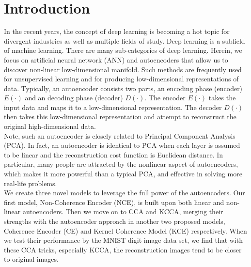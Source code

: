 \documentclass[12pt]{report} %
\begin{document}
\chapter{Introduction}
In the recent years, the concept of deep learning is becoming a hot topic for divergent industries as well as multiple fields of study\cite{AUKM,TF,PR,DLRG}. Deep learning is a subfield of machine learning. There are many sub-categories of deep learning. Herein, we focus on artificial neural network (ANN)\cite{NN,NN2} and autoencoders\cite{AE,AE2,AE3} that allow us to discover non-linear low-dimensional manifold. Such methods are frequently used for unsupervised learning and for producing low-dimensional representations of data. Typically, an autoencoder consists two parts, an encoding phase (encoder) \(E(\cdot)\) and an decoding phase (decoder) \(D(\cdot)\). The encoder \(E(\cdot)\) takes the input data and maps it to a low-dimensional representation. The decoder \(D(\cdot)\) then takes this low-dimensional representation and attempt to reconstruct the original high-dimensional data.\\
Note, such an autoencoder is closely related to Principal Component Analysis (PCA)\cite{PCA,PCA2,STAT,KPCA}. In fact, an autoencoder is identical to PCA when each layer is assumed to be linear and the reconstruction cost function is Euclidean distance. In particular, many people are attracted by the nonlinear aspect of autoencoders, which makes it more powerful than a typical PCA, and effective in solving more real-life problems.\\
We create three novel models to leverage the full power of the autoencoders. Our first model, Non-Coherence Encoder (NCE), is built upon both linear and non-linear autoencoders. Then we move on to CCA\cite{CCA,ECCA} and KCCA\cite{KCCA}, merging their strengths with the autoencoder approach in another two proposed models, Coherence Encoder (CE) and Kernel Coherence Model (KCE) respectively. When we test their performance by the MNIST\cite{MNIST} digit image data set, we find that with these CCA tricks, especially KCCA, the reconstruction images tend to be closer to original images. \\
\end{document}
